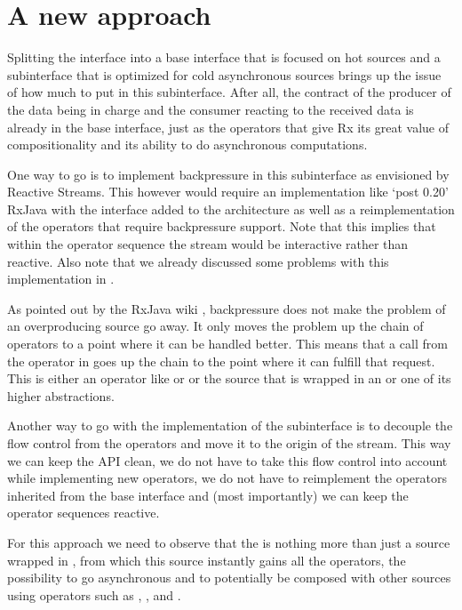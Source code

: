 \section{A new approach}
Splitting the \obs interface into a base interface that is focused on hot sources and a subinterface that is optimized for cold asynchronous sources brings up the issue of how much to put in this subinterface. After all, the contract of the producer of the data being in charge and the consumer reacting to the received data is already in the base interface, just as the operators that give Rx its great value of compositionality and its ability to do asynchronous computations.

One way to go is to implement backpressure in this subinterface as envisioned by Reactive Streams. This however would require an implementation like `post 0.20' RxJava with the  interface added to the architecture as well as a reimplementation of the operators that require backpressure support. Note that this implies that within the operator sequence the stream would be interactive rather than reactive. Also note that we already discussed some problems with this implementation in .

As pointed out by the RxJava wiki \cite{RxJava-Wiki-Backpressure}, backpressure does not make the problem of an overproducing source go away. It only moves the problem up the chain of operators to a point where it can be handled better. This means that a  call from the  operator in  goes up the chain to the point where it can fulfill that request. This is either an operator like  or  or the source that is wrapped in an  or one of its higher abstractions.

Another way to go with the implementation of the subinterface is to decouple the flow control from the operators and move it to the origin of the stream. This way we can keep the API clean, we do not have to take this flow control into account while implementing new operators, we do not have to reimplement the operators inherited from the base interface and (most importantly) we can keep the operator sequences reactive.

For this approach we need to observe that the \obs is nothing more than just a source wrapped in , from which this source instantly gains all the operators, the possibility to go asynchronous and to potentially be composed with other sources using operators such as , ,  and .

